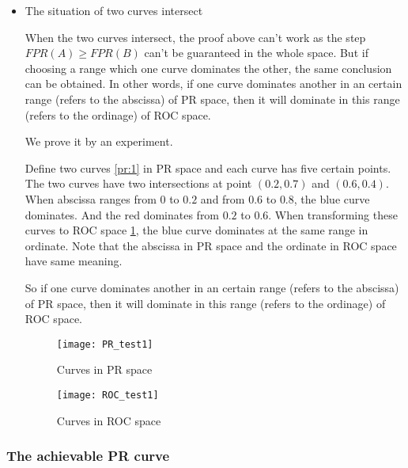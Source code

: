 \documentclass[a4paper,12pt]{article}
\begin{document}
\begin{itemize}
\begin{proof}
Similarly, if a curve dominates in PR space then it dominates in ROC space, we don't give the proof as it is similar to the proof above.
\end{proof}
\item The situation of two curves intersect 

When the two curves intersect, the proof above can't work as the step $FPR(A)\ge FPR(B)$ can't be guaranteed in the whole space. But if choosing a range which one curve dominates the other, the same conclusion can be obtained. In other words, if one curve dominates another in an certain range (refers to the abscissa) of PR space, then it will dominate in this range (refers to the ordinage) of ROC space. 

We prove it by an experiment.

Define two curves \ref{pr:1} in PR space and each curve has five certain points. The two curves have two intersections at point $(0.2,0.7)$ and $(0.6,0.4)$. When abscissa ranges from $0$ to $0.2$ and from $0.6$ to $0.8$, the blue curve dominates. And the red dominates from $0.2$ to $0.6$. When transforming these curves to ROC space \ref{roc:1}, the blue curve dominates at the same range in ordinate. Note that the abscissa in PR space and the ordinate in ROC space have same meaning.

So if one curve dominates another in an certain range (refers to the abscissa) of PR space, then it will dominate in this range (refers to the ordinage) of ROC space. 
 
\begin{figure}[!ht]
\begin{minipage}[t]{0.5\textwidth}
\centering\texttt{[image: PR\_test1]}
\caption{Curves in PR space}\label{pr:1}
\end{minipage}
\begin{minipage}[t]{0.5\textwidth}
\centering\texttt{[image: ROC\_test1]}
\caption{Curves in ROC space}\label{roc:1}
\end{minipage}
\end{figure}
\end{itemize}

\subsubsection{The achievable PR curve}
\end{document}
